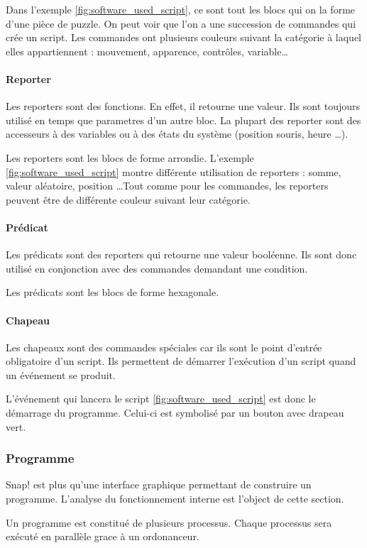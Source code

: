 Dans l'exemple \ref{fig:software_used_script}, ce sont tout les blocs qui on la forme d'une pièce de puzzle. On peut voir que l'on a une succession de commandes qui crée un script. Les commandes ont plusieurs couleurs suivant la catégorie à laquel elles appartiennent : mouvement, apparence, contrôles, variable\ldots

\paragraph{Reporter}
Les reporters sont des fonctions. En effet, il retourne une valeur. Ils sont toujours utilisé en temps que parametres d'un autre bloc. La plupart des reporter sont des accesseurs à des variables ou à des états du système (position souris, heure \ldots). 

Les reporters sont les blocs de forme arrondie. L'exemple \ref{fig:software_used_script} montre différente utilisation de reporters : somme, valeur aléatoire, position \ldots Tout comme pour les commandes, les reporters peuvent être de différente couleur suivant leur catégorie.

\paragraph{Prédicat}
Les prédicats sont des reporters qui retourne une valeur booléenne. Ils sont donc utilisé en conjonction avec des commandes demandant une condition.

Les prédicats sont les blocs de forme hexagonale.

\paragraph{Chapeau}
Les chapeaux sont des commandes spéciales car ils sont le point d'entrée obligatoire d'un script. Ils permettent de démarrer l'exécution d'un script quand un événement se produit.

L'événement qui lancera le script \ref{fig:software_used_script} est donc le démarrage du programme. Celui-ci est symbolisé par un bouton avec drapeau vert.

\subsubsection{Programme}
Snap! est plus qu'une interface graphique permettant de construire un programme. L'analyse du fonctionnement interne est l'object de cette section.

Un programme est constitué de plusieurs processus. Chaque processus sera exécuté en parallèle grace à un ordonanceur.

